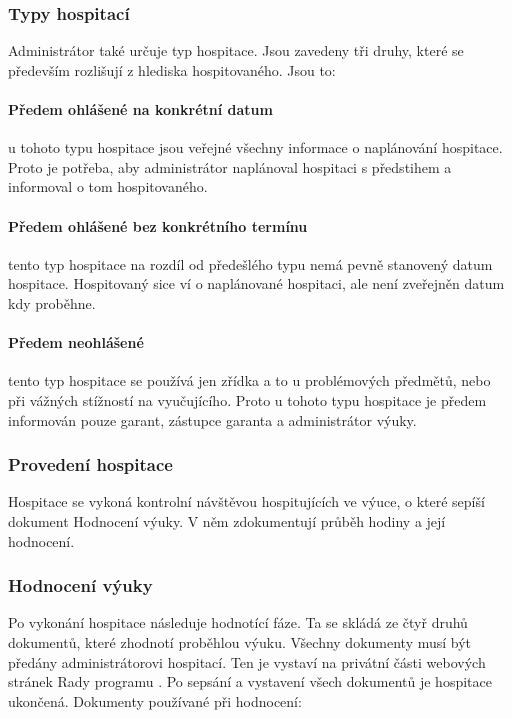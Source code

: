 \subsubsection{Typy hospitací}
Administrátor také určuje typ hospitace. Jsou zavedeny tři druhy, které se především rozlišují z hlediska hospitovaného.  Jsou to:

\paragraph*{Předem ohlášené na konkrétní datum} 
u tohoto typu hospitace jsou veřejné všechny informace o naplánování hospitace. Proto je potřeba, aby administrátor naplánoval hospitaci s předstihem a informoval o tom hospitovaného.

\paragraph*{Předem ohlášené bez konkrétního termínu} 
tento typ hospitace na rozdíl od předešlého typu nemá pevně stanovený datum hospitace. Hospitovaný sice ví o naplánované hospitaci, ale není zveřejněn datum kdy proběhne.

\paragraph*{Předem neohlášené} 
tento typ hospitace se používá jen zřídka a to u problémových předmětů, nebo při vážných stížností na vyučujícího. Proto u  tohoto typu hospitace je předem informován pouze garant, zástupce garanta a administrátor výuky.

\subsubsection{Provedení hospitace}
Hospitace se vykoná kontrolní návštěvou hospitujících ve výuce, o které sepíší dokument Hodnocení výuky. V něm zdokumentují průběh hodiny a její hodnocení.

\subsubsection{Hodnocení výuky}
Po vykonání hospitace následuje hodnotící fáze. Ta se skládá ze čtyř druhů dokumentů, které zhodnotí proběhlou výuku. Všechny dokumenty musí být předány administrátorovi hospitací. Ten je vystaví na privátní části webových stránek Rady programu \cite{kvalitavyukyweb}. Po sepsání a vystavení všech dokumentů je hospitace ukončená. Dokumenty používané při hodnocení:

